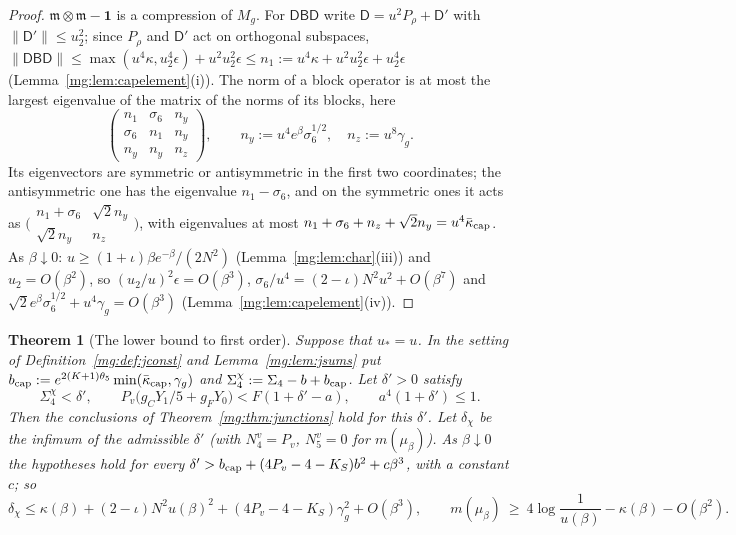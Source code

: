 \documentclass[11pt,a4paper]{article}
\newtheorem{theorem}{Theorem}[section]
\theoremstyle{definition}
\theoremstyle{remark}
\newcommand{\norm}[1]{\lVert #1\rVert}
\begin{document}
\begin{proof}
$\mathfrak m\otimes\mathfrak m-\mathbf1$ is a compression of $M_g$. For $\mathsf D\mathsf B\mathsf D$ write $\mathsf D=u^2P_\rho+\mathsf D'$ with $\norm{\mathsf D'}\le u_2^2$;
since $P_\rho$ and $\mathsf D'$ act on orthogonal subspaces, $\norm{\mathsf D\mathsf B\mathsf D}\le\max(u^4\kappa,u_2^4\epsilon)+u^2u_2^2\epsilon\le n_1:=u^4\kappa+u^2u_2^2\epsilon+u_2^4\epsilon$
(Lemma~\ref{mg:lem:capelement}(i)). The norm of a block operator is at most the largest eigenvalue of the matrix of the norms of its blocks, here
\[
\begin{pmatrix}n_1&\sigma_6&n_y\\\sigma_6&n_1&n_y\\n_y&n_y&n_z\end{pmatrix},\qquad n_y:=u^4e^\beta\sigma_6^{1/2},\quad n_z:=u^8\gamma_g .
\]
Its eigenvectors are symmetric or antisymmetric in the first two coordinates; the antisymmetric one has the eigenvalue $n_1-\sigma_6$, and on the
symmetric ones it acts as $\bigl(\begin{smallmatrix}n_1+\sigma_6&\sqrt2n_y\\\sqrt2n_y&n_z\end{smallmatrix}\bigr)$, with eigenvalues at most
$n_1+\sigma_6+n_z+\sqrt2n_y=u^4\bar\kappa_{\rm cap}$. As $\beta\downarrow0$: $u\ge(1+\iota)\beta e^{-\beta}/(2N^2)$ (Lemma~\ref{mg:lem:char}(iii)) and
$u_2=O(\beta^2)$, so $(u_2/u)^2\epsilon=O(\beta^3)$, $\sigma_6/u^4=(2-\iota)N^2u^2+O(\beta^7)$ and $\sqrt2e^\beta\sigma_6^{1/2}+u^4\gamma_g=O(\beta^3)$
(Lemma~\ref{mg:lem:capelement}(iv)).
\end{proof}

\begin{theorem}[The lower bound to first order]\label{mg:thm:caplower}
Suppose that $u_*=u$. In the setting of Definition~\ref{mg:def:jconst} and Lemma~\ref{mg:lem:jsums} put
$b_{\rm cap}:=e^{2(K+1)\theta_5}\min(\bar\kappa_{\rm cap},\gamma_g)$ and $\Sigma_4^\chi:=\Sigma_4-b+b_{\rm cap}$. Let $\delta'>0$ satisfy
\[
\Sigma_4^\chi<\delta',\qquad P_v\bigl(g_CY_1/5+g_FY_0\bigr)<F(1+\delta'-a),\qquad a^4(1+\delta')\le1 .
\]
Then the conclusions of Theorem~\ref{mg:thm:junctions} hold for this $\delta'$. Let $\delta_\chi$ be the infimum of the admissible $\delta'$ (with
$N^v_4=P_v$, $N^v_5=0$ for $m(\mu_\beta)$). As $\beta\downarrow0$ the hypotheses hold for every $\delta'>b_{\rm cap}+(4P_v-4-K_S)b^2+c\beta^3$, with a
constant $c$; so
\[
\delta_\chi\le\kappa(\beta)+(2-\iota)N^2u(\beta)^2+(4P_v-4-K_S)\gamma_g^2+O(\beta^3),\qquad m(\mu_\beta)\ \ge\ 4\log\frac1{u(\beta)}-\kappa(\beta)-O(\beta^2).
\]
\end{theorem}
\end{document}
